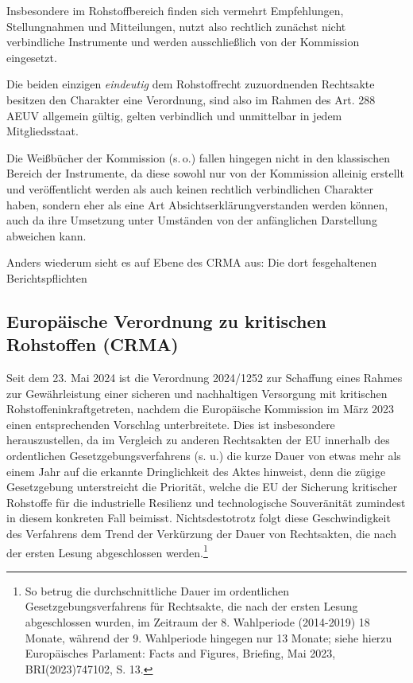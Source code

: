 \documentclass[12pt,a4paper,oneside]{book} %
\begin{document}
Insbesondere im Rohstoffbereich finden sich vermehrt Empfehlungen, Stellungnahmen und Mitteilungen, nutzt also rechtlich zunächst nicht verbindliche Instrumente und werden ausschließlich von der Kommission eingesetzt.
	
Die beiden einzigen \textit{eindeutig} dem Rohstoffrecht zuzuordnenden Rechtsakte besitzen den Charakter eine Verordnung, sind also im Rahmen des Art. 288 AEUV allgemein gültig, gelten verbindlich und unmittelbar in jedem Mitgliedsstaat.
	
	
	
Die Weißbücher der Kommission (s.\,o.) fallen hingegen nicht in den klassischen Bereich der Instrumente, da diese sowohl nur von der Kommission alleinig erstellt und veröffentlicht werden als auch keinen rechtlich verbindlichen Charakter haben, sondern eher als eine Art \glqq Absichtserklärung\grqq verstanden werden können, auch da ihre Umsetzung unter Umständen von der anfänglichen Darstellung abweichen kann.\autocite[siehe hierzu]{Dauses/Ludwigs, O. Umweltrecht, Rn. 196} 
	
Anders wiederum sieht es auf Ebene des CRMA aus: Die dort fesgehaltenen Berichtspflichten
	
\subsection{Europäische Verordnung zu kritischen Rohstoffen (CRMA)}\label{EU-Verordnung}
	
	
Seit dem 23. Mai 2024 ist die Verordnung 2024/1252 \glqq zur Schaffung eines Rahmes zur Gewährleistung einer sicheren und nachhaltigen Versorgung mit kritischen Rohstoffen\grqq inkraftgetreten, nachdem die Europäische Kommission im März 2023 einen entsprechenden Vorschlag unterbreitete. Dies ist insbesondere herauszustellen, da im Vergleich zu anderen Rechtsakten der EU innerhalb des ordentlichen Gesetzgebungsverfahrens (s. u.) die kurze Dauer von etwas mehr als einem Jahr auf die erkannte Dringlichkeit des Aktes hinweist, denn die zügige Gesetzgebung unterstreicht die Priorität, welche die EU der Sicherung kritischer Rohstoffe für die industrielle Resilienz und technologische Souveränität zumindest in diesem konkreten Fall beimisst. Nichtsdestotrotz folgt diese Geschwindigkeit des Verfahrens dem Trend der Verkürzung der Dauer von Rechtsakten, die nach der ersten Lesung abgeschlossen werden.\footnote{So betrug die durchschnittliche Dauer im ordentlichen Gesetzgebungsverfahrens für Rechtsakte, die nach der ersten Lesung abgeschlossen wurden, im Zeitraum der 8. Wahlperiode (2014-2019) 18 Monate, während der 9. Wahlperiode hingegen nur 13 Monate; siehe hierzu Europäisches Parlament: Facts and Figures, Briefing, Mai 2023, BRI(2023)747102, S. 13.} 
	
\end{document}
